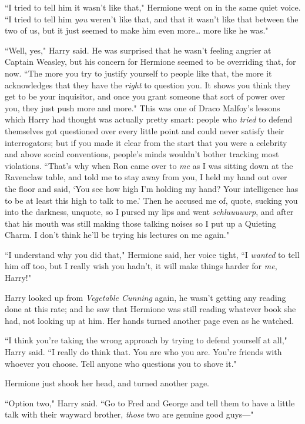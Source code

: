 ``I tried to tell him it wasn't like that," Hermione went on in the same quiet voice. ``I tried to tell him \emph{you} weren't like that, and that it wasn't like that between the two of us, but it just seemed to make him even more{\ldots} more like he was."

``Well, yes," Harry said. He was surprised that he wasn't feeling angrier at Captain Weasley, but his concern for Hermione seemed to be overriding that, for now. ``The more you try to justify yourself to people like that, the more it acknowledges that they have the \emph{right} to question you. It shows you think they get to be your inquisitor, and once you grant someone that sort of power over you, they just push more and more." This was one of Draco Malfoy's lessons which Harry had thought was actually pretty smart: people who \emph{tried} to defend themselves got questioned over every little point and could never satisfy their interrogators; but if you made it clear from the start that you were a celebrity and above social conventions, people's minds wouldn't bother tracking most violations. ``That's why when Ron came over to \emph{me} as I was sitting down at the Ravenclaw table, and told me to stay away from you, I held my hand out over the floor and said, `You see how high I'm holding my hand? Your intelligence has to be at least this high to talk to me.' Then he accused me of, quote, sucking you into the darkness, unquote, so I pursed my lips and went \emph{schluuuuurp}, and after that his mouth was still making those talking noises so I put up a Quieting Charm. I don't think he'll be trying his lectures on me again."

``I understand why you did that," Hermione said, her voice tight, ``I \emph{wanted} to tell him off too, but I really wish you hadn't, it will make things harder for \emph{me}, Harry!"

Harry looked up from \emph{Vegetable Cunning} again, he wasn't getting any reading done at this rate; and he saw that Hermione was still reading whatever book she had, not looking up at him. Her hands turned another page even as he watched.

``I think you're taking the wrong approach by trying to defend yourself at all," Harry said. ``I really do think that. You are who you are. You're friends with whoever you choose. Tell anyone who questions you to shove it."

Hermione just shook her head, and turned another page.

``Option two," Harry said. ``Go to Fred and George and tell them to have a little talk with their wayward brother, \emph{those} two are genuine good guys---"

